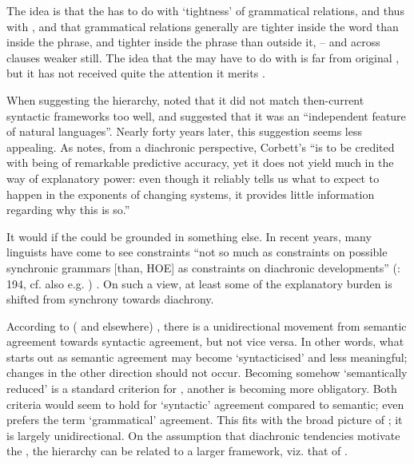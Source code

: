 \documentclass[output=paper]{langsci/langscibook}
\begin{document}
\begin{exe}
\begin{xlist}
\begin{xlist}

The idea is that the  has to do with `tightness' of
grammatical relations, and thus with , and that
grammatical relations generally are tighter inside the word than inside
the phrase, and tighter inside the phrase than outside it, -- and across
clauses weaker still. The idea that the  may have to
do with  is far from original %
\citep[cf.][]{Lehmann82,Lehmann16}%
%
, but it has not received quite the attention it merits %
\citep[though see][]{Jobin04}%
%
.

When suggesting the hierarchy, %
\citet[217]{Corbett79} %
%
noted that it did not
match then-current syntactic frameworks too well, and suggested that it
was an ``independent feature of natural languages''. Nearly forty years
later, this suggestion seems less appealing. As %
\citet[58]{Dolberg14}
%
notes, from a diachronic perspective, Corbett's  ``is
to be credited with being of remarkable predictive accuracy, yet it does
not yield much in the way of explanatory power: even though it reliably
tells us what to expect to happen in the exponents of changing 
systems, it provides little information regarding why this is so.''

It would if the  could be grounded in something else.
In recent years, many linguists have come to see constraints ``not so
much as constraints on possible synchronic grammars {[}than, HOE{]} as
constraints on diachronic developments'' %
(\citealt{Timberlake03}: 194, cf. also e.g. \citealt{Evans2009})%
%
. On such a view, at least some of the
explanatory burden is shifted from synchrony towards diachrony.

According to %
\citeauthor{Lehmann82} (\citeyear{Lehmann82,Lehmann15} and elsewhere)%
%
%
, there is a unidirectional movement from semantic agreement towards syntactic
agreement, but not vice versa. In other words, what starts out as
semantic agreement may become `syntacticised' and less meaningful;
changes in the other direction should not occur. Becoming somehow
`semantically reduced' is a standard criterion for ,
another is becoming more obligatory. Both criteria would seem to hold
for `syntactic' agreement compared to semantic; %
\citet{Wechlser03} %
%
even
prefers the term `grammatical' agreement. This fits with the broad
picture of ; it is largely unidirectional. On the
assumption that diachronic tendencies motivate the ,
the hierarchy can be related to a larger framework, viz. that of
.


\end{xlist}
\end{xlist}
\end{exe}
\end{document}
